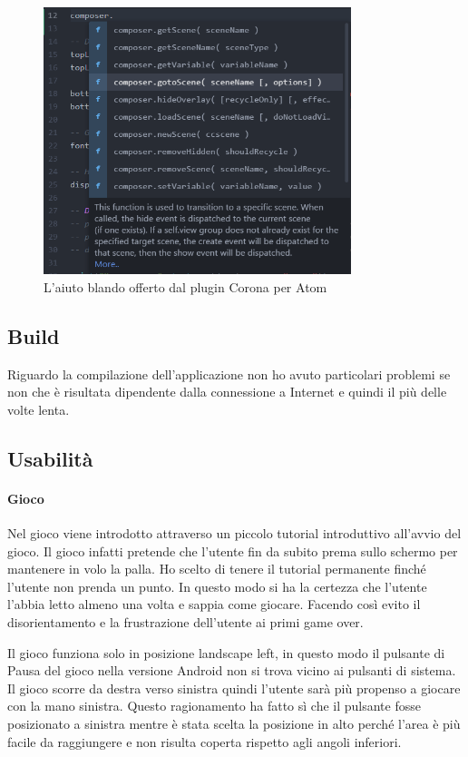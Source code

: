 			\begin{figure} [t]
				\centering
				\includegraphics[width=0.8\textwidth]{img/atomPlugin}
				\caption{L'aiuto blando offerto dal plugin Corona per Atom}
				\label{fig:atomPlugin}
			\end{figure}
		
		\subsection{Build}
			Riguardo la compilazione dell'applicazione non ho avuto particolari problemi se non che è risultata dipendente dalla connessione a Internet e quindi il più delle volte lenta. 
	
	
	\subsection{Usabilità}
				
		\paragraph{Gioco}
			Nel gioco viene introdotto attraverso un piccolo tutorial introduttivo all'avvio del gioco. Il gioco infatti pretende che l'utente fin da subito prema sullo schermo per mantenere in volo la palla. Ho scelto di tenere il tutorial permanente finché l'utente non prenda un punto. In questo modo si ha la certezza che l'utente l'abbia letto almeno una volta e sappia come giocare. Facendo così evito il disorientamento e la frustrazione dell'utente ai primi game over.
			
			Il gioco funziona solo in posizione landscape left, in questo modo il pulsante di Pausa del gioco nella versione Android non si trova vicino ai pulsanti di sistema. Il gioco scorre da destra verso sinistra quindi l'utente sarà più propenso a giocare con la mano sinistra. Questo ragionamento ha fatto sì che il pulsante fosse posizionato a sinistra mentre è stata scelta la posizione in alto perché l'area è più facile da raggiungere e non risulta coperta rispetto agli angoli inferiori.
		
